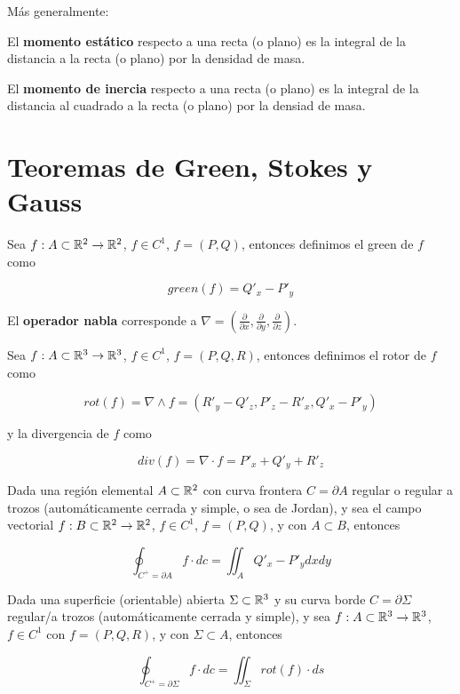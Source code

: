 \begin{center}
\begin{tabular}{|p{4cm}|c|c|c| }
\end{tabular}
\end{center}

Más generalmente: 

El \textbf{momento estático} respecto a una recta (o plano) es la integral de la distancia a la recta (o plano) por la densidad de masa. 
 
El \textbf{momento de inercia} respecto a una recta (o plano) es la integral de la distancia al cuadrado a la recta (o plano) por la densiad de masa.



\chapter{Teoremas de Green, Stokes y Gauss}

\begin{definition}
Sea $f : A \subset \mathbb{R}^2 \to \mathbb{R}^2$, $f \in C^1$,  $ f=(P,Q)$, entonces definimos el green de $f$ como

$$ green(f) = Q'_x - P'_y $$

El \textbf{operador nabla} corresponde a $ \nabla = \left( \frac{\partial}{\partial x}, \frac{\partial}{\partial y}, \frac{\partial}{\partial z} \right)$.

Sea $f : A \subset \mathbb{R}^3 \to \mathbb{R}^3$, $f \in C^1$, $ f=(P,Q,R)$, entonces definimos el rotor de $f$ como

$$ rot(f) = \nabla \wedge f = (R'_y - Q'_z, P'_z - R'_x, Q'_x - P'_y) $$

y la divergencia de $f$ como

$$ div(f) = \nabla \cdot f = P'_x + Q'_y + R'_z $$
\end{definition}

\begin{theorem} 
Dada una región elemental $ A \subset \mathbb{R}^2$ con curva frontera $ C = \partial A$ regular o regular a trozos (automáticamente cerrada y simple, o sea de Jordan), y sea el campo vectorial $f : B \subset \mathbb{R}^2 \to \mathbb{R}^2$, $f \in C^1$, $f = (P,Q)$, y con $ A \subset B$, entonces

$$ \displaystyle \oint_{C^+ = \partial A} f \cdot dc = \iint_A Q'_x - P'_y dxdy $$
\end{theorem}

\begin{theorem} 
Dada una superficie (orientable) abierta $ \Sigma \subset \mathbb{R}^3$ y su curva borde $ C = \partial \Sigma$ regular/a trozos (automáticamente cerrada y simple), y sea $ f : A \subset \mathbb{R}^3 \to \mathbb{R}^3$, $f \in C^1$ con $ f = (P,Q,R)$, y con $ \Sigma \subset A$, entonces

$$ \displaystyle \oint_{C^+ = \partial \Sigma} f \cdot dc = \iint_{\Sigma} rot(f) \cdot ds $$
\end{theorem}

